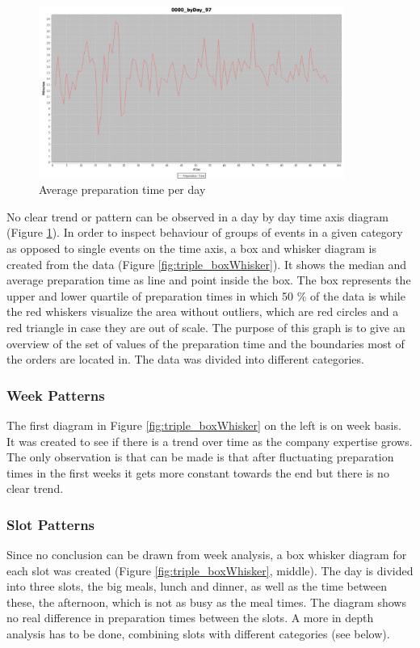 \begin{figure}[h]
\begin{center}
\includegraphics[width=10cm]{images/0000_byDay_97.png}
\caption{Average preparation time per day}
\label{fig:0000_byDay_97}
\end{center}
\end{figure}


No clear trend or pattern can be observed in a day by day time axis diagram (Figure \ref{fig:0000_byDay_97}). In order to inspect behaviour of groups of events in a given category as opposed to single events on the time axis, a box and whisker diagram is created from the data (Figure \ref{fig:triple_boxWhisker}). It shows the median and average preparation time as line and point inside the box. The box represents the upper and lower quartile of preparation times in which 50 \% of the data is while the red whiskers visualize the area without outliers, which are red circles and a red triangle in case they are out of scale. The purpose of this graph is to give an overview of the set of values of the preparation time and the boundaries most of the orders are located in. The data was divided into different categories.\newline
\subsubsection{Week Patterns}
The first diagram in Figure \ref{fig:triple_boxWhisker} on the left is on week basis. It was created to see if there is a trend over time as the company expertise grows. The only observation is that can be made is that after fluctuating preparation times in the first weeks it gets more constant towards the end but there is no clear trend.
\subsubsection{Slot Patterns}
Since no conclusion can be drawn from week analysis, a box whisker diagram for each slot was created (Figure \ref{fig:triple_boxWhisker}, middle). The day is divided into three slots, the big meals, lunch and dinner, as well as the time between these, the afternoon, which is not as busy as the meal times. The diagram shows no real difference in preparation times between the slots. A more in depth analysis has to be done, combining slots with different categories (see below).

